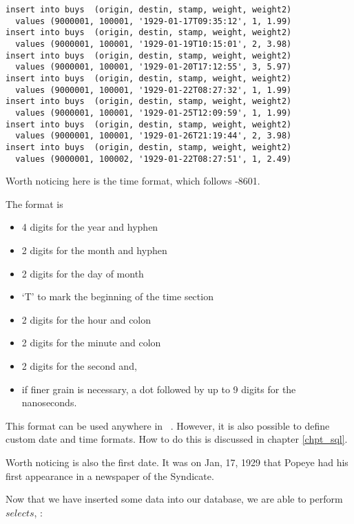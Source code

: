 \begin{sqlcode}
\begin{lstlisting}
insert into buys  (origin, destin, stamp, weight, weight2)
  values (9000001, 100001, '1929-01-17T09:35:12', 1, 1.99)
insert into buys  (origin, destin, stamp, weight, weight2)
  values (9000001, 100001, '1929-01-19T10:15:01', 2, 3.98)
insert into buys  (origin, destin, stamp, weight, weight2)
  values (9000001, 100001, '1929-01-20T17:12:55', 3, 5.97)
insert into buys  (origin, destin, stamp, weight, weight2)
  values (9000001, 100001, '1929-01-22T08:27:32', 1, 1.99)
insert into buys  (origin, destin, stamp, weight, weight2)
  values (9000001, 100001, '1929-01-25T12:09:59', 1, 1.99)
insert into buys  (origin, destin, stamp, weight, weight2)
  values (9000001, 100001, '1929-01-26T21:19:44', 2, 3.98)
insert into buys  (origin, destin, stamp, weight, weight2)
  values (9000001, 100002, '1929-01-22T08:27:51', 1, 2.49)
\end{lstlisting}
\end{sqlcode}

\begin{minipage}{\textwidth}
Worth noticing here is the time format,
which follows -8601.

The format is
\begin{itemize}
\item 4 digits for the year and hyphen
\item 2 digits for the month and hyphen
\item 2 digits for the day of month
\item `T' to mark the beginning of the time section
\item 2 digits for the hour and colon
\item 2 digits for the minute and colon
\item 2 digits for the second and,
\item if finer grain is necessary,
a dot followed by up to 9 digits
for the nanoseconds.
\end{itemize}
\end{minipage}

This format can be used anywhere in \nowdb\ \sql.
However, it is also possible to define custom
date and time formats. How to do this is discussed
in chapter \ref{chpt_sql}.

Worth noticing is also the first date.
It was on Jan, 17, 1929 that Popeye had his first
appearance in a newspaper of the 
Syndicate.

Now that we have inserted some data
into our database, we are able to perform $selects$, \eg:

